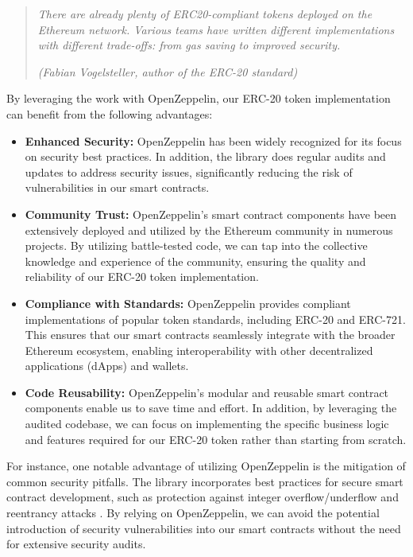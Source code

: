 \begin{quote}
   \textit{There are already plenty of ERC20-compliant tokens deployed on the Ethereum network. Various teams have written different implementations with different trade-offs: from gas saving to improved security.}


   \textit{(Fabian Vogelsteller, author of the ERC-20 standard)}
\end{quote}


By leveraging the work with OpenZeppelin, our ERC-20 token implementation can benefit from the following advantages:
\begin{itemize}
\item \textbf{Enhanced Security:} OpenZeppelin has been widely recognized for its focus on security best practices. In addition, the library does regular audits and updates to address security issues, significantly reducing the risk of vulnerabilities in our smart contracts.
\item \textbf{Community Trust:} OpenZeppelin's smart contract components have been extensively deployed and utilized by the Ethereum community in numerous projects. By utilizing battle-tested code, we can tap into the collective knowledge and experience of the community, ensuring the quality and reliability of our ERC-20 token implementation.
\item \textbf{Compliance with Standards:} OpenZeppelin provides compliant implementations of popular token standards, including ERC-20 and ERC-721. This ensures that our smart contracts seamlessly integrate with the broader Ethereum ecosystem, enabling interoperability with other decentralized applications (dApps) and wallets.
\item \textbf{Code Reusability:} OpenZeppelin's modular and reusable smart contract components enable us to save time and effort. In addition, by leveraging the audited codebase, we can focus on implementing the specific business logic and features required for our ERC-20 token rather than starting from scratch.
\end{itemize}
For instance, one notable advantage of utilizing OpenZeppelin is the mitigation of common security pitfalls. The library incorporates best practices for secure smart contract development, 
such as protection against integer overflow/underflow and reentrancy attacks \cite{solidity_reeantrency_attack}. By relying on OpenZeppelin, we can avoid the potential introduction of 
security vulnerabilities into our smart contracts without the need for extensive security audits.

